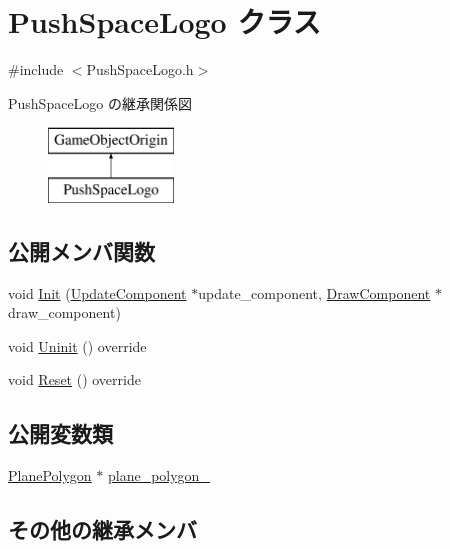 \hypertarget{class_push_space_logo}{}\section{Push\+Space\+Logo クラス}
\label{class_push_space_logo}


{\ttfamily \#include $<$Push\+Space\+Logo.\+h$>$}

Push\+Space\+Logo の継承関係図\begin{figure}[H]
\begin{center}
\leavevmode
\includegraphics[height=2.000000cm]{class_push_space_logo}
\end{center}
\end{figure}
\subsection*{公開メンバ関数}
\begin{DoxyCompactItemize}
\item 
void \mbox{\hyperlink{class_push_space_logo_af22e94b451e42a581396b9f0e8b9b15b}{Init}} (\mbox{\hyperlink{class_update_component}{Update\+Component}} $\ast$update\+\_\+component, \mbox{\hyperlink{class_draw_component}{Draw\+Component}} $\ast$draw\+\_\+component)
\item 
void \mbox{\hyperlink{class_push_space_logo_a06404113db417c58941ca7a13bba161e}{Uninit}} () override
\item 
void \mbox{\hyperlink{class_push_space_logo_afa163b1aff8df494b4f09f378bf983f0}{Reset}} () override
\end{DoxyCompactItemize}
\subsection*{公開変数類}
\begin{DoxyCompactItemize}
\item 
\mbox{\hyperlink{class_plane_polygon}{Plane\+Polygon}} $\ast$ \mbox{\hyperlink{class_push_space_logo_ab35a4cee269c3ba0b709a8951ccc3d42}{plane\+\_\+polygon\+\_\+}}
\end{DoxyCompactItemize}
\subsection*{その他の継承メンバ}


